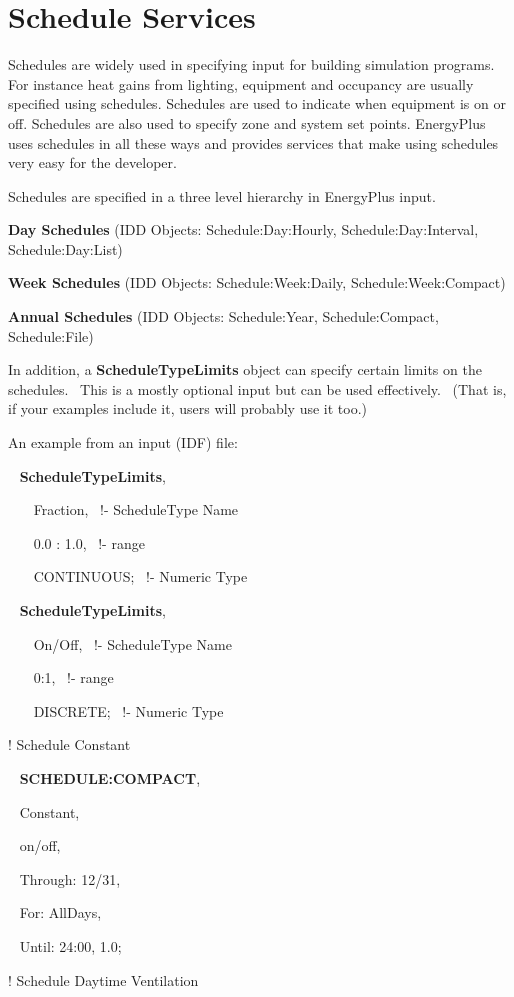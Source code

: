 \section{Schedule Services}\label{schedule-services}

Schedules are widely used in specifying input for building simulation programs. For instance heat gains from lighting, equipment and occupancy are usually specified using schedules. Schedules are used to indicate when equipment is on or off. Schedules are also used to specify zone and system set points. EnergyPlus uses schedules in all these ways and provides services that make using schedules very easy for the developer.

Schedules are specified in a three level hierarchy in EnergyPlus input.

\textbf{Day Schedules} (IDD Objects: Schedule:Day:Hourly, Schedule:Day:Interval, Schedule:Day:List)

\textbf{Week Schedules} (IDD Objects: Schedule:Week:Daily, Schedule:Week:Compact)

\textbf{Annual Schedules} (IDD Objects: Schedule:Year, Schedule:Compact, Schedule:File)

In addition, a \textbf{ScheduleTypeLimits} object can specify certain limits on the schedules.~ This is a mostly optional input but can be used effectively.~ (That is, if your examples include it, users will probably use it too.)

An example from an input (IDF) file:

~ \textbf{ScheduleTypeLimits},

~~~ Fraction,~ !- ScheduleType Name

~~~ 0.0 : 1.0,~ !- range

~~~ CONTINUOUS;~ !- Numeric Type

~ \textbf{ScheduleTypeLimits},

~~~ On/Off,~ !- ScheduleType Name

~~~ 0:1,~ !- range

~~~ DISCRETE;~ !- Numeric Type

! Schedule Constant

~ \textbf{SCHEDULE:COMPACT},

~ Constant,

~ on/off,

~ Through: 12/31,

~ For: AllDays,

~ Until: 24:00, 1.0;

! Schedule Daytime Ventilation

